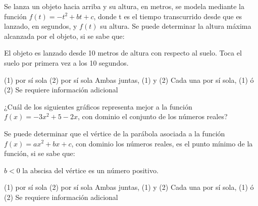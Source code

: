 \documentclass[borrador]{srs3}
\begin{document}
\begin{preguntas}
\pregunta Se lanza un objeto hacia arriba y su altura, en metros, se modela mediante la función \(f\left(t\right) = -t^2+bt+c\), donde t es el tiempo transcurrido desde que es lanzado, en segundos, y \(f\left(t\right)\) su altura. Se puede determinar la altura máxima alcanzada por el objeto, si se sabe que:
\begin{opciones*}
\opcion El objeto es lanzado desde 10 metros de altura con respecto al suelo.
\opcion Toca el suelo por primera vez a los 10 segundos.
\end{opciones*}
\begin{alternativas}
\alternativa (1) por sí sola
\alternativa (2) por sí sola
\alternativa Ambas juntas, (1) y (2)
\alternativa Cada una por sí sola, (1) ó (2)
\alternativa Se requiere información adicional
\end{alternativas}

\pregunta ¿Cuál de los siguientes gráficos representa mejor a la función \(f\left(x\right) = -3x^2 + 5 - 2x\), con dominio el conjunto de los números reales?
\begin{alternativas}[2]
\alternativa {}
\alternativa {}
\alternativa {}
\alternativa {}

\end{alternativas}

\pregunta Se puede determinar que el vértice de la parábola asociada a la función \(f\left(x\right) = ax^2 + bx + c\), con dominio los números reales, es el punto mínimo de la función, si se sabe que:
\begin{opciones*}
\opcion \(b<0\)
\opcion la abscisa del vértice es un número positivo.
\end{opciones*}
\begin{alternativas}
\alternativa (1) por sí sola
\alternativa (2) por sí sola
\alternativa Ambas juntas, (1) y (2)
\alternativa Cada una por sí sola, (1) ó (2)
\alternativa Se requiere información adicional
\end{alternativas}


\end{preguntas}
\end{document}
